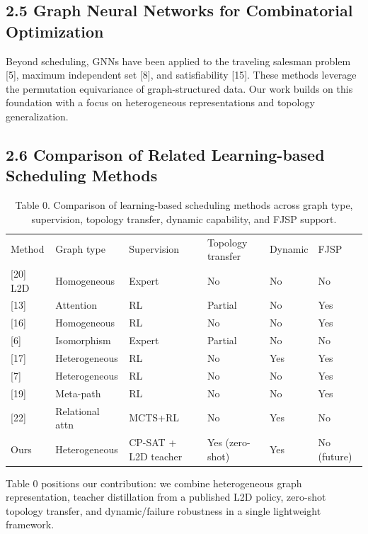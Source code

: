 \documentclass{article}
\begin{document}
\subsection*{2.5 Graph Neural Networks for Combinatorial Optimization}

Beyond scheduling, GNNs have been applied to the traveling salesman problem {[}5{]}, maximum independent set {[}8{]}, and satisfiability {[}15{]}. These methods leverage the permutation equivariance of graph-structured data. Our work builds on this foundation with a focus on heterogeneous representations and topology generalization.


\subsection*{2.6 Comparison of Related Learning-based Scheduling Methods}

\begin{table}[h]
\centering
\begin{tabular}{llllll}
\toprule
Method & Graph type & Supervision & Topology transfer & Dynamic & FJSP \\
{[}20{]} L2D & Homogeneous & Expert & No & No & No \\
{[}13{]} & Attention & RL & Partial & No & Yes \\
{[}16{]} & Homogeneous & RL & No & No & Yes \\
{[}6{]} & Isomorphism & Expert & Partial & No & No \\
{[}17{]} & Heterogeneous & RL & No & Yes & Yes \\
{[}7{]} & Heterogeneous & RL & No & No & Yes \\
{[}19{]} & Meta-path & RL & No & No & Yes \\
{[}22{]} & Relational attn & MCTS+RL & No & Yes & No \\
Ours & Heterogeneous & CP-SAT + L2D teacher & Yes (zero-shot) & Yes & No (future) \\
\bottomrule
\end{tabular}
\caption{Table 0. Comparison of learning-based scheduling methods across graph type, supervision, topology transfer, dynamic capability, and FJSP support.}
\end{table}

Table 0 positions our contribution: we combine heterogeneous graph representation, teacher distillation from a published L2D policy, zero-shot topology transfer, and dynamic/failure robustness in a single lightweight framework.
\end{document}

